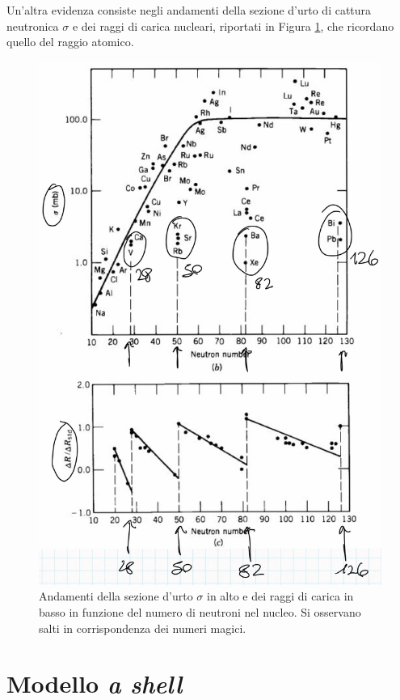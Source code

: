 \noindent Un'altra evidenza consiste negli andamenti della sezione d'urto di cattura neutronica $\sigma$ e dei raggi di carica nucleari, riportati in Figura \ref{sigmar}, che ricordano quello del raggio atomico.

\begin{figure}[!h]
    \centering
    \includegraphics[scale=0.3]{Immagini/mag-num2.png}
    \caption{Andamenti della sezione d'urto $\sigma$ in alto e dei raggi di carica in basso in funzione del numero di neutroni nel nucleo. Si osservano salti in corrispondenza dei numeri magici.}
    \label{sigmar}
\end{figure}
\newpage
\section{Modello \textit{a shell}}
